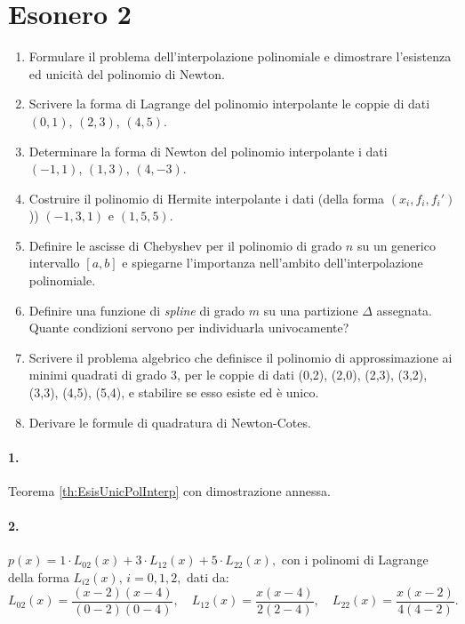 \section{Esonero 2}
\begin{enumerate}
    \item Formulare il problema dell'interpolazione polinomiale e dimostrare l'esistenza ed unicità del polinomio di Newton.
    \item Scrivere la forma di Lagrange del polinomio interpolante le coppie di dati $(0,1),\, (2,3),\, (4,5)$.
    \item Determinare la forma di Newton del polinomio interpolante i dati $(-1, 1),\, (1, 3),\, (4, -3)$.
    \item Costruire il polinomio di Hermite interpolante i dati (della forma $(x_i, f_i, f_i')$)) $(-1, 3, 1)$ e $(1, 5, 5)$.
    \item Definire le ascisse di Chebyshev per il polinomio di grado $n$ su un generico intervallo $[a,b]$ e spiegarne l'importanza nell'ambito dell'interpolazione polinomiale.
    \item Definire una funzione di \textit{spline} di grado $m$ su una partizione $\Delta$ assegnata. Quante condizioni servono per individuarla univocamente?
    \item Scrivere il problema algebrico che definisce il polinomio di approssimazione ai minimi quadrati di grado 3, per le coppie di dati (0,2), (2,0), (2,3), (3,2), (3,3), (4,5), (5,4), e stabilire se esso esiste ed è unico.
    \item Derivare le formule di quadratura di Newton-Cotes.
\end{enumerate}

\paragraph{1.} Teorema \ref{th:EsisUnicPolInterp} con dimostrazione annessa.

\paragraph{2.} $p(x)= 1\cdot L_{02}(x)+3\cdot L_{12}(x)+5 \cdot L_{22}(x),$ con i polinomi di Lagrange della forma $L_{i2}(x),\, i=0,1,2,$ dati da:
\begin{equation*}
    L_{02}(x) = \frac{(x-2)(x-4)}{(0-2)(0-4)},\quad L_{12}(x)=\frac{x(x-4)}{2(2-4)},\quad L_{22}(x)=\frac{x(x-2)}{4(4-2)}.
\end{equation*}

